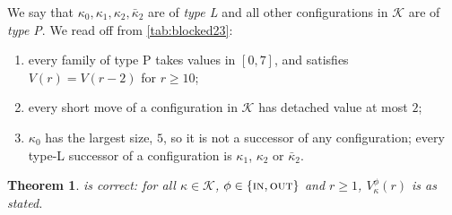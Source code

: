 \documentclass[11pt]{amsart}
\newtheorem{theorem}{Theorem}[section]
\theoremstyle{definition}
\theoremstyle{remark}
\newcommand{\IN}{\textup{\textsc{in}}}
\newcommand{\OUT}{\textup{\textsc{out}}}
\begin{document}
We say that $\kappa_0,\kappa_1,\kappa_2,\bar\kappa_2$ are of \emph{type L} and all other configurations in $\mathcal K$ are of \emph{type P}. We read off from \cref{tab:blocked23}:
\begin{enumerate}[label=\textup{(T\arabic*)},leftmargin=*]
\item every family of type P takes values in $[0,7]$, and satisfies $V(r)=V(r-2)$ for $r\ge10$;
\item every short move of a configuration in $\mathcal K$ has detached value at most $2$;
\item $\kappa_0$ has the largest size, $5$, so it is not a successor of any configuration; every type-L successor of a configuration is $\kappa_1$, $\kappa_2$ or $\bar\kappa_2$.
\end{enumerate}

\begin{theorem}\label{thm:table23}
 is correct: for all $\kappa\in\mathcal K$, $\phi\in\{\IN,\OUT\}$ and $r\ge1$, $V^\phi_\kappa(r)$ is as stated.
\end{theorem}
\end{document}
